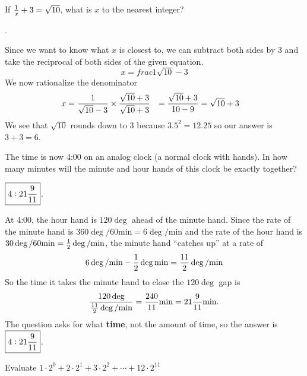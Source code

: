 \documentclass[11pt]{article}
\DeclareRobustCommand{\frac}[3][0pt]{%
  {\begingroup\hspace{#1}#2\hspace{#1}\endgroup\over\hspace{#1}#3\hspace{#1}}}
\begin{document}

\begin{problem}If $\frac{1}{x} + 3 = \sqrt{10}$, what is $x$ to the nearest integer?
\end{problem}

\begin{answer}
.
\end{answer}
\begin{solution}
Since we want to know what $x$ is closest to, we can subtract both sides by 3 and take the reciprocal of both sides of the given equation.
$$x = frac{1}{\sqrt{10}-3}$$
We now rationalize the denominator
\begin{align*}
x &= \frac{1}{\sqrt{10}-3} \times \frac{\sqrt{10}+3}{\sqrt{10}+3}
&= \frac{\sqrt{10}+3}{10-9}
&= \sqrt{10}+3
\end{align*}
We see that $\sqrt{10}$ rounds down to 3 because $3.5^2 = 12.25$ so our answer is $3+3=\boxed{6}$.
\end{solution}

\begin{problem}The time is now 4:00 on an analog clock (a normal clock with hands). In how many minutes will the minute and hour hands of this clock be exactly together? %
\end{problem}

\begin{answer}
$\boxed{4:21 \frac{9}{11}}$.
\end{answer}
\begin{solution}
At 4:00, the hour hand is $120 \deg$ ahead of the minute hand. Since the rate of the minute hand is $360 \deg / 60 \text{min} = 6 \deg / \text{min}$ and the rate of the hour hand is $30 \deg / 60 \text{min}= \frac{1}{2} \deg / \text{min}$, the minute hand ``catches up'' at a rate of
$$6 \deg / \text{min}-\frac{1}{2} \deg \text{min} = \frac{11}{2} \deg / \text{min}$$
So the time it takes the minute hand to close the $120 \deg$ gap is
$$\frac{120 \deg}{\frac{11}{2} \deg / \text{min}} = \frac{240}{11} \text{min} = 21 \frac{9}{11} \text{min}.$$
The question asks for what \textbf{time}, not the amount of time, so the answer is $\boxed{4:21 \frac{9}{11}}$.
\end{solution}

\begin{problem}Evaluate $1\cdot2^{0} + 2\cdot2^1 + 3\cdot2^2 +\cdots+12\cdot2^{11}$
\end{problem}
\end{document}
